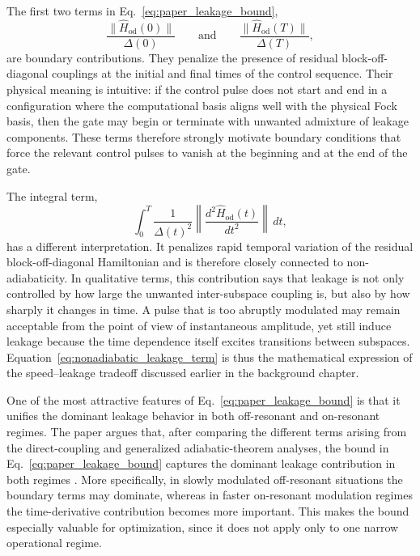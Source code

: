 The first two terms in Eq.~\eqref{eq:paper_leakage_bound},
\begin{equation}
\frac{\|\hat{H}_{\mathrm{od}}(0)\|}{\Delta(0)}
\qquad \text{and} \qquad
\frac{\|\hat{H}_{\mathrm{od}}(T)\|}{\Delta(T)},
\label{eq:boundary_leakage_terms}
\end{equation}
are boundary contributions. They penalize the presence of residual block-off-diagonal couplings at the initial and final times of the control sequence. Their physical meaning is intuitive: if the control pulse does not start and end in a configuration where the computational basis aligns well with the physical Fock basis, then the gate may begin or terminate with unwanted admixture of leakage components. These terms therefore strongly motivate boundary conditions that force the relevant control pulses to vanish at the beginning and at the end of the gate.

The integral term,
\begin{equation}
\int_{0}^{T}
\frac{1}{\Delta(t)^{2}}
\left\|
\frac{d^{2}\hat{H}_{\mathrm{od}}(t)}{dt^{2}}
\right\|
\,dt,
\label{eq:nonadiabatic_leakage_term}
\end{equation}
has a different interpretation. It penalizes rapid temporal variation of the residual block-off-diagonal Hamiltonian and is therefore closely connected to non-adiabaticity. In qualitative terms, this contribution says that leakage is not only controlled by how large the unwanted inter-subspace coupling is, but also by how sharply it changes in time. A pulse that is too abruptly modulated may remain acceptable from the point of view of instantaneous amplitude, yet still induce leakage because the time dependence itself excites transitions between subspaces. Equation~\eqref{eq:nonadiabatic_leakage_term} is thus the mathematical expression of the speed--leakage tradeoff discussed earlier in the background chapter.

One of the most attractive features of Eq.~\eqref{eq:paper_leakage_bound} is that it unifies the dominant leakage behavior in both off-resonant and on-resonant regimes. The paper argues that, after comparing the different terms arising from the direct-coupling and generalized adiabatic-theorem analyses, the bound in Eq.~\eqref{eq:paper_leakage_bound} captures the dominant leakage contribution in both regimes \cite{Niu2019}. More specifically, in slowly modulated off-resonant situations the boundary terms may dominate, whereas in faster on-resonant modulation regimes the time-derivative contribution becomes more important. This makes the bound especially valuable for optimization, since it does not apply only to one narrow operational regime.

